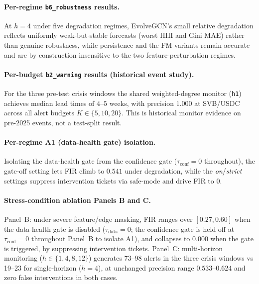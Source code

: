 \paragraph{Per-regime \texttt{b6\_robustness} results.}
\label{app:b6-detail}

At $h{=}4$ under five degradation regimes, EvolveGCN's small relative
degradation reflects uniformly weak-but-stable forecasts (worst HHI and
Gini MAE) rather than genuine robustness, while persistence and the FM
variants remain accurate and are by construction insensitive to the two
feature-perturbation regimes.

\paragraph{Per-budget \texttt{b2\_warning} results (historical event study).}
\label{app:b2-budget}

For the three pre-test crisis windows the shared weighted-degree
monitor (\texttt{h1}) achieves median lead times of $4$--$5$ weeks,
with precision $1.000$ at SVB/USDC across all alert budgets
$K\!\in\!\{5,10,20\}$. This is historical monitor evidence on
pre-2025 events, not a test-split result.

\paragraph{Per-regime A1 (data-health gate) isolation.}
\label{app:a1-isolated}

Isolating the data-health gate from the confidence gate
($\tau_{\mathrm{conf}}{=}0$ throughout), the gate-off setting lets FIR climb
to $0.541$ under degradation, while the \textit{on}/\textit{strict} settings
suppress intervention tickets via safe-mode and drive FIR to $0$.

\paragraph{Stress-condition ablation Panels B and C.}
\label{app:ablation-stress}

Panel~B: under severe feature/edge masking, FIR ranges over
$[0.27,0.60]$ when the data-health gate is disabled
($\tau_{\mathrm{data}}\!=\!0$; the confidence gate is held off at
$\tau_{\mathrm{conf}}\!=\!0$ throughout Panel~B to isolate A1), and
collapses to $0.000$ when the gate is triggered, by suppressing
intervention tickets.
Panel~C: multi-horizon monitoring ($h\!\in\!\{1,4,8,12\}$) generates
73--98 alerts in the three crisis windows vs 19--23 for
single-horizon ($h\!=\!4$), at unchanged precision range
$0.533$--$0.624$ and zero false interventions in both cases.

